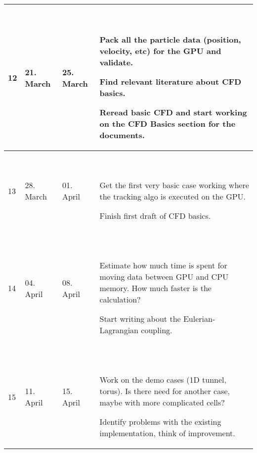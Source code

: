 \documentclass[
  a4wide,
  smallheadings
]{article}
\begin{document}
\begin{supertabular}{|p{1.5cm}|p{2cm}|p{2cm}|p{8cm}|}
    \hline

    12 & 21. March & 25. March &
    
     \begin{compactitem}
        \item Pack all the particle data (position, velocity, etc) for the GPU
              and validate.
        \item Find relevant literature about CFD basics.
        \item Reread basic CFD and start working on the CFD Basics section for
              the documents.
    \end{compactitem} \\
    
    \hline

    13 & 28. March & 01. April &
    
     \begin{compactitem}
        \item Get the first very basic case working where the tracking algo is
              executed on the GPU.
        \item Finish first draft of CFD basics.
    \end{compactitem} \\
    
    \hline
    
    14 & 04. April & 08. April &
    
     \begin{compactitem}
        \item Estimate how much time is spent for moving data between GPU and
              CPU memory. How much faster is the calculation?
        \item Start writing about the Eulerian-Lagrangian coupling.
    \end{compactitem} \\

    \hline

    15 & 11. April & 15. April &
    
     \begin{compactitem}
        \item Work on the demo cases (1D tunnel, torus). Is there need for
              another case, maybe with more complicated cells?
        \item Identify problems with the existing implementation, think of
              improvement.
    \end{compactitem} \\
    

\end{supertabular}
\end{document}

